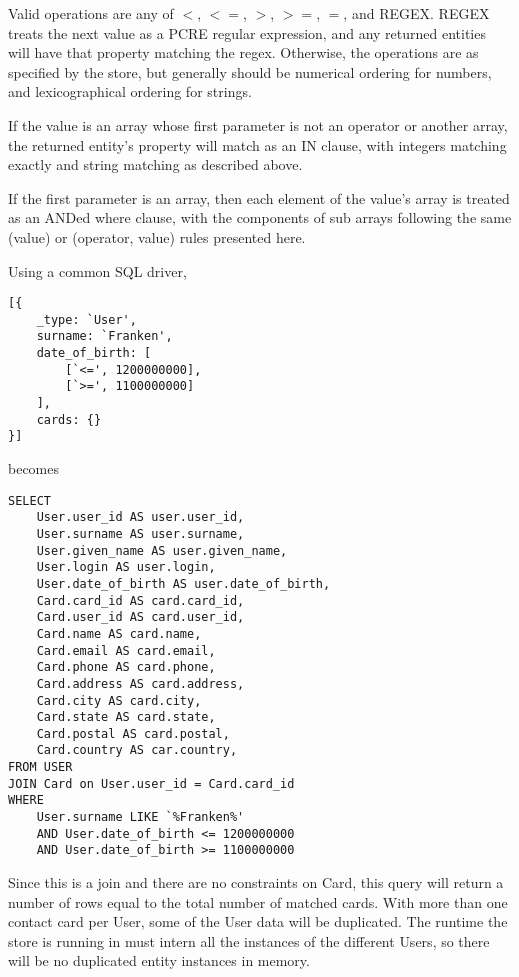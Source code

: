 \documentclass{article}
\renewcommand{\|}{\textbar}
\begin{document}
Valid operations are any of {\ilcode $<$}, {\ilcode $<=$}, {\ilcode $>$},
{\ilcode $>=$}, {\ilcode $=$}, and {\ilcode REGEX}. {\ilcode REGEX} treats the
next value as a PCRE regular expression, and any returned entities will have
that property matching the regex. Otherwise, the operations are as specified by
the store, but generally should be numerical ordering for numbers, and
lexicographical ordering for strings.



If the value is an array whose first parameter is not an operator or another
array, the returned entity's property will match as an IN clause, with integers
matching exactly and string matching as described above.

If the first parameter is an array, then each element of the value's array is
treated as an ANDed where clause, with the components of sub arrays following
the same (value) or (operator, value) rules presented here.

Using a common SQL driver,
\linespread{1}
\begin{lstlisting}
[{
	_type: `User',
	surname: `Franken',
	date_of_birth: [
		[`<=', 1200000000],
		[`>=', 1100000000]
	],
	cards: {}
}]
\end{lstlisting}
\linespread{1.6}

becomes

\linespread{1}
\lstset{language=SQL}
\begin{lstlisting}
SELECT
	User.user_id AS user.user_id,
	User.surname AS user.surname,
	User.given_name AS user.given_name,
	User.login AS user.login,
	User.date_of_birth AS user.date_of_birth,
	Card.card_id AS card.card_id,
	Card.user_id AS card.user_id,
	Card.name AS card.name,
	Card.email AS card.email,
	Card.phone AS card.phone,
	Card.address AS card.address,
	Card.city AS card.city,
	Card.state AS card.state,
	Card.postal AS card.postal,
	Card.country AS car.country,
FROM USER
JOIN Card on User.user_id = Card.card_id
WHERE
	User.surname LIKE `%Franken%'
	AND User.date_of_birth <= 1200000000
	AND User.date_of_birth >= 1100000000
\end{lstlisting}
\lstset{language=JavaScript}
\linespread{1.6}

Since this is a join and there are no constraints on {\ilcode Card}, this
query will return a number of rows equal to the total number of matched cards.
With more than one contact card per {\ilcode User}, some of the User data will
be duplicated. The runtime the store is running in must intern all the instances
of the different {\ilcode Users}, so there will be no duplicated entity
instances in memory.
\end{document}
